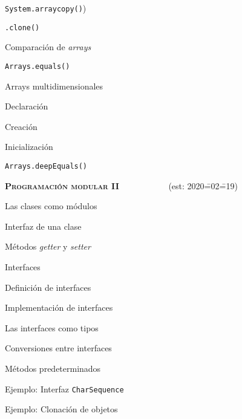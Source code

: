 \begin{longenum}
\begin{longenum}
\begin{longenum}
\begin{longenum}
                \item \texttt{System.arraycopy()})
                \item \texttt{.clone()} 
            \end{longenum}
            \item Comparación de \textit{arrays}
            \begin{longenum}
                \item \texttt{Arrays.equals()}
            \end{longenum}
            \item Arrays multidimensionales
            \begin{longenum}
                \item Declaración
                \item Creación
                \item Inicialización
                \item \texttt{Arrays.deepEquals()} 
            \end{longenum}
        \end{longenum}
    \end{longenum}
    \item \textbf{\textsc{Programación modular II}} \ \ \ \ \ \ \ \ \ \ \ (est: 2020\==02\==19)
    \begin{longenum}
        \item Las clases como módulos
        \begin{longenum}
            \item Interfaz de una clase
            \item Métodos \textit{getter} y \textit{setter}
        \end{longenum}
        \item Interfaces
        \begin{longenum}
            \item Definición de interfaces
            \item Implementación de interfaces
            \item Las interfaces como tipos
            \item Conversiones entre interfaces
            \item Métodos predeterminados
            \item Ejemplo: Interfaz \texttt{CharSequence}
            \item Ejemplo: Clonación de objetos
            \begin{longenum}

\end{longenum}
\end{longenum}
\end{longenum}
\end{longenum}
